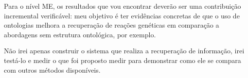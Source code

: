 \documentclass{article}
\begin{document}
Para o nível ME, os resultados que vou encontrar deverão ser uma contribuição incremental verificável: meu objetivo é ter evidências concretas de que o uso de ontologias melhora a recuperação de reações genéticas em comparação a abordagens sem estrutura ontológica, por exemplo.

Não irei apenas construir o sistema que realiza a recuperação de informação, irei testá-lo e medir o que foi proposto medir para demonstrar como ele se compara com outros métodos disponíveis.
\end{document}
